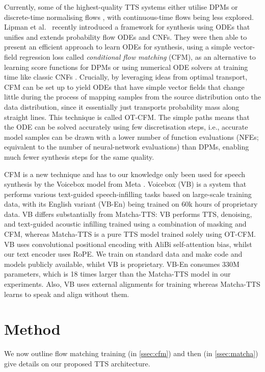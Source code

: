 \documentclass[british]{article}
\begin{document}
Currently, some of the highest-quality TTS systems either utilise DPMs
\cite{popov2021grad, betker2023better}
or discrete-time normalising flows \cite{kim2021vits,mehta2023overflow}, with continuous-time flows being less explored.
Lipman et al.\ \cite{lipman2023flow} recently introduced a framework for synthesis using ODEs that unifies and extends probability flow ODEs and CNFs.
They were then able to present an efficient approach to learn ODEs for synthesis, using a simple vector-field regression loss called \emph{conditional flow matching} (CFM), as an alternative to learning score functions for DPMs or using numerical ODE solvers at training time like classic CNFs \cite{chen2018neural}.
Crucially, by leveraging ideas from optimal transport, CFM can be set up to yield ODEs that have simple vector fields that change little during the process of mapping samples from the source distribution onto the data distribution, since it essentially just transports probability mass along straight lines.
This technique is called OT-CFM.
The simple paths means that the ODE can be solved accurately using few discretisation steps, i.e., accurate model samples can be drawn with a lower number of function evaluations (NFEs; equivalent to the number of neural-network evaluations) than DPMs, enabling much fewer synthesis steps for the same quality.







CFM is a new technique and has to our knowledge only been used for speech synthesis by the Voicebox model from Meta  \cite{le2023voicebox}.
Voicebox (VB) is a system that performs various text-guided speech-infilling tasks based on large-scale training data, with its English variant (VB-En) being trained on 60k hours of proprietary data.
VB differs substantially from Matcha-TTS:
VB performs TTS, denoising, and text-guided acoustic infilling trained using a combination of masking and CFM, whereas Matcha-TTS is a pure TTS model trained solely using OT-CFM.
VB uses convolutional positional encoding with AliBi self-attention bias, whilst our text encoder uses RoPE.
We train on standard data and make code and models publicly available, whilst VB is proprietary.
VB-En consumes 330M parameters, which is 18 times larger than the Matcha-TTS model in our experiments.
Also, VB uses external alignments for training whereas Matcha-TTS learns to speak and align without them.



\section{Method}
\label{sec:method}
We now outline flow matching training (in \cref{ssec:cfm}) and then (in \cref{ssec:matcha}) give details on our proposed TTS architecture.
\end{document}

